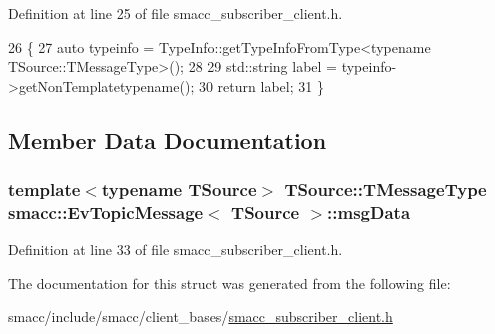 Definition at line 25 of file smacc\+\_\+subscriber\+\_\+client.\+h.


\begin{DoxyCode}
26   \{
27     \textcolor{keyword}{auto} typeinfo = TypeInfo::getTypeInfoFromType<typename TSource::TMessageType>();
28 
29     std::string label = typeinfo->getNonTemplatetypename();
30     \textcolor{keywordflow}{return} label;
31   \}
\end{DoxyCode}


\subsection{Member Data Documentation}
\subsubsection[{\texorpdfstring{msg\+Data}{msgData}}]{\setlength{\rightskip}{0pt plus 5cm}template$<$typename T\+Source$>$ T\+Source\+::\+T\+Message\+Type {\bf smacc\+::\+Ev\+Topic\+Message}$<$ T\+Source $>$\+::msg\+Data}\hypertarget{structsmacc_1_1EvTopicMessage_aff4421ef3bb469c7f91f0a7ad7a20819}{}\label{structsmacc_1_1EvTopicMessage_aff4421ef3bb469c7f91f0a7ad7a20819}


Definition at line 33 of file smacc\+\_\+subscriber\+\_\+client.\+h.



The documentation for this struct was generated from the following file\+:\begin{DoxyCompactItemize}
\item 
smacc/include/smacc/client\+\_\+bases/\hyperlink{smacc__subscriber__client_8h}{smacc\+\_\+subscriber\+\_\+client.\+h}\end{DoxyCompactItemize}
